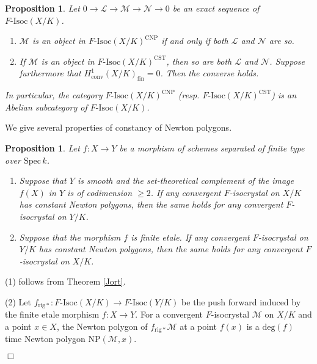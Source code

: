 \documentclass[11pt]{amsart}
\newtheorem{proposition}[Lemma]{Proposition}
\begin{document}
\begin{proposition}\label{Abel} Let $0 \rightarrow \mathcal L \rightarrow \mathcal M \rightarrow \mathcal N \rightarrow 0$ 
be an exact sequence of $F\mbox{-}\mathrm{Isoc}(X/K)$. 
\begin{enumerate}
\item $\mathcal M$ is an object in $F\mbox{-}\mathrm{Isoc}(X/K)^{\mathrm{CNP}}$ 
if and only if both $\mathcal L$ and $\mathcal N$ are so.
\item If $\mathcal M$ is an object in $F\mbox{-}\mathrm{Isoc}(X/K)^{\mathrm{CST}}$, 
then so are both $\mathcal L$ and $\mathcal N$. Suppose furthermore that 
$H_{\mathrm{conv}}^1(X/K)_{\mathrm{fin}}  = 0$. Then the converse holds.
\end{enumerate}
In particular, the category 
$F\mbox{-}\mathrm{Isoc}(X/K)^{\mathrm{CNP}}$ (resp. 
$F\mbox{-}\mathrm{Isoc}(X/K)^{\mathrm{CST}}$) is an Abelian subcategory 
of $F\mbox{-}\mathrm{Isoc}(X/K)$. 
\end{proposition}

\vspace*{3mm}

We give several properties of constancy of Newton polygons. 

\begin{proposition}\label{dominant} 
Let $f : X \rightarrow Y$ be a morphism of schemes separated of finite type over $\mathrm{Spec}\, k$. 
\begin{enumerate}
\item Suppose that $Y$ is smooth and the set-theoretical complement of the image $f(X)$ in $Y$ 
is of codimension $\geq 2$. 
If any convergent $F$-isocrystal on $X/K$ has constant Newton polygons, then 
the same holds for any convergent $F$-isocrystal on $Y/K$. 
\item Suppose that the morphism $f$ is finite etale. 
If any convergent $F$-isocrystal on $Y/K$ has constant Newton polygons, then 
the same holds for any convergent $F$-isocrystal on $X/K$. 
\end{enumerate}
\end{proposition}

{ {(1) follows from Theorem \ref{Jort}.

(2) Let $f_{\mathrm{rig} \ast} : F\mbox{-}\mathrm{Isoc}(X/K) \rightarrow F\mbox{-}\mathrm{Isoc}(Y/K)$ 
be the push forward induced by the finite etale morphism $f : X \rightarrow Y$. 
For a convergent $F$-isocrystal $\mathcal M$ on $X/K$ and a point $x \in X$, the Newton polygon of 
 $f_{\mathrm{rig} \ast}\mathcal M$ at a point $f(x)$ is a $\mathrm{deg}(f)$ time Newton polygon $\mathrm{NP}(\mathcal M, x)$. 
} \hspace*{\fill} $\Box$}
\end{document}
